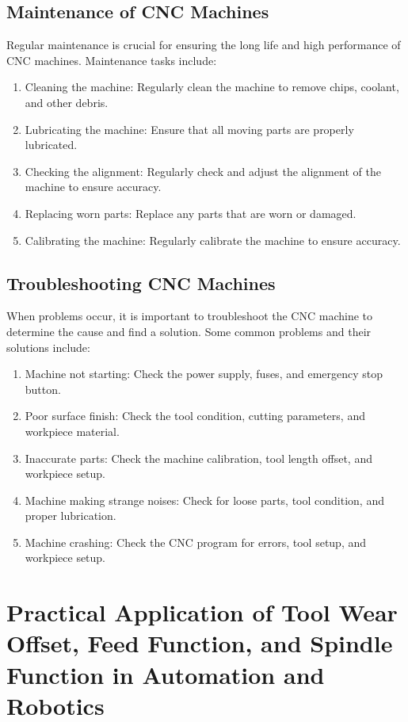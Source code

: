 \documentclass{article}
\begin{document}
\subsection{Maintenance of CNC Machines}
Regular maintenance is crucial for ensuring the long life and high performance of CNC machines. Maintenance tasks include:
\begin{enumerate}
    \item Cleaning the machine: Regularly clean the machine to remove chips, coolant, and other debris.
    \item Lubricating the machine: Ensure that all moving parts are properly lubricated.
    \item Checking the alignment: Regularly check and adjust the alignment of the machine to ensure accuracy.
    \item Replacing worn parts: Replace any parts that are worn or damaged.
    \item Calibrating the machine: Regularly calibrate the machine to ensure accuracy.
\end{enumerate}

\subsection{Troubleshooting CNC Machines}
When problems occur, it is important to troubleshoot the CNC machine to determine the cause and find a solution. Some common problems and their solutions include:
\begin{enumerate}
    \item Machine not starting: Check the power supply, fuses, and emergency stop button.
    \item Poor surface finish: Check the tool condition, cutting parameters, and workpiece material.
    \item Inaccurate parts: Check the machine calibration, tool length offset, and workpiece setup.
    \item Machine making strange noises: Check for loose parts, tool condition, and proper lubrication.
    \item Machine crashing: Check the CNC program for errors, tool setup, and workpiece setup.
\end{enumerate}

\section*{Practical Application of Tool Wear Offset, Feed Function, and Spindle Function in Automation and Robotics}
\end{document}
